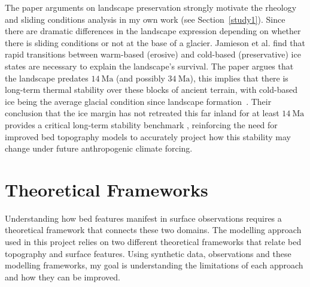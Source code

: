The paper arguments on landscape preservation strongly motivate the rheology and sliding conditions analysis in my own work (see Section~\ref{study1}). Since there are dramatic differences in the landscape expression depending on whether there is sliding conditions or not at the base of a glacier. Jamieson et al. find that rapid transitions between warm-based (erosive) and cold-based (preservative) ice states are necessary to explain the landscape's survival. The paper argues that the landscape predates $14~\mathrm{Ma}$ (and possibly $34~\mathrm{Ma}$), this implies that there is long-term thermal stability over these blocks of ancient terrain, with cold-based ice being the average glacial condition since landscape formation~\cite{Jamieson_2023}.  Their conclusion that the ice margin has not retreated this far inland for at least $14~\mathrm{Ma}$ provides a critical long-term stability benchmark , reinforcing the need for improved bed topography models to accurately project how this stability may change under future anthropogenic climate forcing.

\newpage
\section{Theoretical Frameworks}\label{theoretical_frameworks}
 Understanding how bed features manifest in surface observations requires a theoretical framework that connects these two domains. The modelling approach used in this project relies on two different theoretical frameworks that relate bed topography and surface features. Using synthetic data, observations and these modelling frameworks, my goal is understanding the limitations of each approach and how they can be improved.

